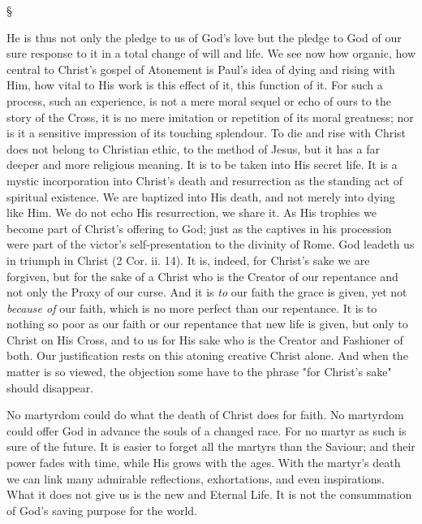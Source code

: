 \documentclass[12pt,letterpaper,oneside]{book}
\begin{document}
\begin{center}
\S
\end{center}

He is thus not only the pledge to us of God's 
love but the pledge to God of our sure response 
to it in a total change of will and life. We see 
now how organic, how central to Christ's gospel 
of Atonement is Paul's idea of dying and rising 
with Him, how vital to His work is this effect 
of it, this function of it. For such a process, 
such an experience, is not a mere moral sequel 
or echo of ours to the story of the Cross, it is 
no mere imitation or repetition of its moral 
greatness; nor is it a sensitive impression of 
its touching splendour. To die and rise with 
Christ does not belong to Christian ethic, to 
the method of Jesus, but it has a far deeper 
and more religious meaning. It is to be taken 
into His secret life. It is a mystic incorporation 
into Christ's death and resurrection as the 
standing act of spiritual existence. We are 
baptized into His death, and not merely into 
dying like Him. We do not echo His resurrection, 
we share it. As His trophies we become 
part of Christ's offering to God; just as the 
captives in his procession were part of the 
victor's self-presentation to the divinity of 
Rome. God leadeth us in triumph in Christ 
(2 Cor. ii. 14). It is, indeed, for Christ's sake 
we are forgiven, but for the sake of a Christ 
who is the Creator of our repentance and not 
only the Proxy of our curse. And it is \textit{to} our 
faith the grace is given, yet not \textit{because of} our 
faith, which is no more perfect than our repentance. 
It is to nothing so poor as our faith or 
our repentance that new life is given, but only 
to Christ on His Cross, and to us for His sake 
who is the Creator and Fashioner of both. Our 
justification rests on this atoning creative Christ 
alone. And when the matter is so viewed, the 
objection some have to the phrase "for Christ's 
sake" should disappear. 

No martyrdom could do what the death of 
Christ does for faith. No martyrdom could 
offer God in advance the souls of a changed 
race. For no martyr as such is sure of the 
future. It is easier to forget all the martyrs 
than the Saviour; and their power fades with 
time, while His grows with the ages. With the 
martyr's death we can link many admirable 
reflections, exhortations, and even inspirations. 
What it does not give us is the new and Eternal 
Life. It is not the consummation of God's saving 
purpose for the world. 
\end{document}
